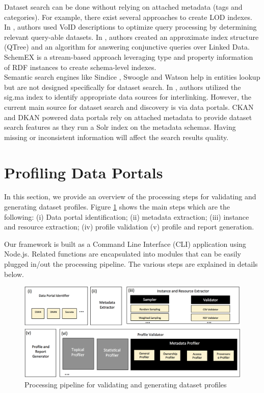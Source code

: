 \documentclass[runningheads,a4paper]{llncs}
\begin{document}
Dataset search can be done without relying on attached metadata (tags and categories). For example, there exist several approaches to create LOD indexes. In \cite{Alexander:LDOW09}, authors used VoID descriptions to optimize query processing by determining relevant query-able datasets. In \cite{Harth:2010:DSO:1772690.1772733}, authors created an approximate index structure (QTree) and an algorithm for answering conjunctive queries over Linked Data. SchemEX \cite{Konrath:2012:SEC:2399444.2399563} is a stream-based approach leveraging type and property information of RDF instances to create schema-level indexes.\\
Semantic search engines like Sindice \cite{Delbru2010a}, Swoogle \cite{Ding2004} and Watson \cite{d'Aquin:2011:WMS:2019470.2019476} help in entities lookup but are not designed specifically for dataset search. In \cite{whatShouldILinkTo}, authors utilized the sig.ma index \cite{sig.ma} to identify appropriate data sources for interlinking. However, the current main source for dataset search and discovery is via data portals. CKAN and DKAN powered data portals rely on attached metadata to provide dataset search features as they run a Solr index on the metadata schemas. Having missing or inconsistent information will affect the search results quality.


\section{Profiling Data Portals}
\label{sec:framework}

In this section, we provide an overview of the processing steps for validating and generating dataset profiles. Figure \ref{fig:1} shows the main steps which are the following: (i) Data portal identification; (ii) metadata extraction; (iii) instance and resource extraction; (iv) profile validation (v) profile and report generation.

Our framework is built as a Command Line Interface (CLI) application using Node.js. Related functions are encapsulated into modules that can be easily plugged in/out the processing pipeline. The various steps are explained in details below.

\begin{figure}[!ht]
  \centering
    \includegraphics[scale=0.4]{figure-1_architecture.png}
  \caption{Processing pipeline for validating and generating dataset profiles}
  \label{fig:1}
\end{figure}
\end{document}
